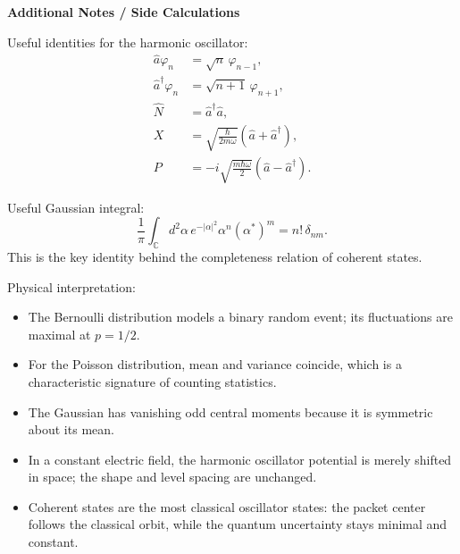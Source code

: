 \documentclass[11pt,a4paper]{scrartcl}
\begin{document}
\textbf{Additional Notes / Side Calculations}

\begin{sidecalcbox}
Useful identities for the harmonic oscillator:
\begin{align*}
    \hat a \varphi_n &= \sqrt{n}\,\varphi_{n-1}, \\
    \hat a^\dagger \varphi_n &= \sqrt{n+1}\,\varphi_{n+1}, \\
    \hat N &= \hat a^\dagger \hat a, \\
    X &= \sqrt{\frac{\hbar}{2m\omega}}(\hat a+\hat a^\dagger), \\
    P &= -i\sqrt{\frac{m\hbar\omega}{2}}(\hat a-\hat a^\dagger).
\end{align*}

Useful Gaussian integral:
\[
\frac1\pi \int_{\mathbb{C}} d^2\alpha\,
e^{-|\alpha|^2}\alpha^n(\alpha^*)^m
= n!\,\delta_{nm}.
\]
This is the key identity behind the completeness relation of coherent states.
\end{sidecalcbox}

\begin{notebox}
Physical interpretation:
\begin{itemize}
    \item The Bernoulli distribution models a binary random event; its fluctuations are maximal at $p=1/2$.
    \item For the Poisson distribution, mean and variance coincide, which is a characteristic signature of counting statistics.
    \item The Gaussian has vanishing odd central moments because it is symmetric about its mean.
    \item In a constant electric field, the harmonic oscillator potential is merely shifted in space; the shape and level spacing are unchanged.
    \item Coherent states are the most classical oscillator states: the packet center follows the classical orbit, while the quantum uncertainty stays minimal and constant.
\end{itemize}
\end{notebox}
\end{document}
